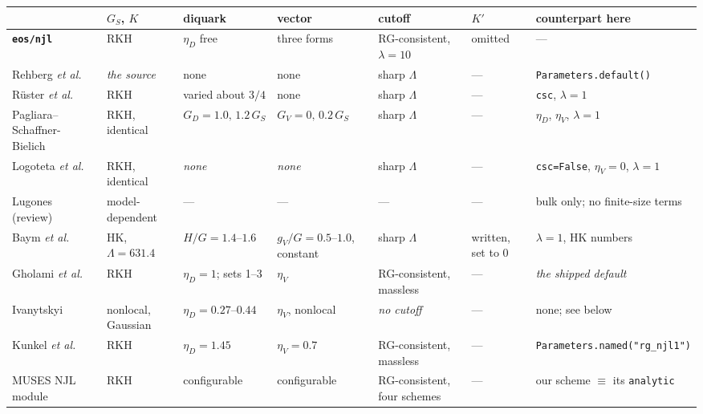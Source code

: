 \documentclass[aps,prc,onecolumn,superscriptaddress,nofootinbib,10pt]{revtex4-2}
\newcommand{\Lam}{\Lambda}
\newcommand{\GS}{G_S}
\newcommand{\GD}{G_D}
\newcommand{\GV}{G_V}
\begin{document}
\begin{center}
\footnotesize
\begin{tabular}{p{}p{}p{}p{}p{}p{}p{}}
\toprule
 & $\GS$, $K$ & diquark & vector & cutoff & $K'$ & counterpart here \\
\midrule
\textbf{\texttt{eos/njl}} & RKH & $\eta_D$ free & three forms &
  RG-consistent, $\lambda = 10$ & omitted & --- \\
Rehberg \textit{et al.}~\cite{Rehberg1996} & \emph{the source} & none & none &
  sharp $\Lam$ & --- & \texttt{Parameters.default()} \\
R\"uster \textit{et al.}~\cite{Ruester2005} & RKH & varied about $3/4$ & none &
  sharp $\Lam$ & --- & \texttt{csc}, $\lambda = 1$ \\
Pagliara--Schaffner-Bielich~\cite{Pagliara2008} & RKH, identical &
  $\GD = 1.0,\,1.2\,\GS$ & $\GV = 0,\,0.2\,\GS$ & sharp $\Lam$ & --- &
  $\eta_D$, $\eta_V$, $\lambda = 1$ \\
Logoteta \textit{et al.}~\cite{Logoteta2012} & RKH, identical & \emph{none} &
  \emph{none} & sharp $\Lam$ & --- &
  \texttt{csc=False}, $\eta_V = 0$, $\lambda = 1$ \\
Lugones~\cite{Lugones2016} (review) & model-dependent & --- & --- & --- & --- &
  bulk only; no finite-size terms \\
Baym \textit{et al.}~\cite{Baym2018} & HK, $\Lam = 631.4$ & $H/G = 1.4$--$1.6$
  & $g_V/G = 0.5$--$1.0$, constant & sharp $\Lam$ & written, set to $0$ &
  $\lambda = 1$, HK numbers \\
Gholami \textit{et al.}~\cite{Gholami2024} & RKH & $\eta_D = 1$; sets 1--3 &
  $\eta_V$ & RG-consistent, massless & --- & \emph{the shipped default} \\
Ivanytskyi~\cite{Ivanytskyi2025} & nonlocal, Gaussian & $\eta_D = 0.27$--$0.44$
  & $\eta_V$, nonlocal & \emph{no cutoff} & --- & none; see below \\
Kunkel \textit{et al.}~\cite{Kunkel2026} & RKH & $\eta_D = 1.45$ &
  $\eta_V = 0.7$ & RG-consistent, massless & --- &
  \texttt{Parameters.\allowbreak named("rg\_njl1")} \\
MUSES NJL module~\cite{MUSESNJL} & RKH & configurable & configurable &
  RG-consistent, four schemes & --- & our scheme $\equiv$ its
  \texttt{analytic} \\
\bottomrule
\end{tabular}
\end{center}
\end{document}
